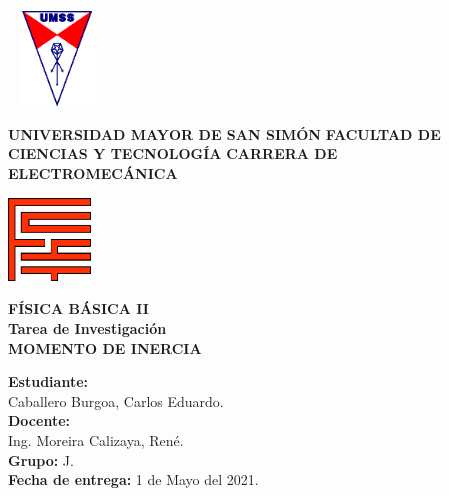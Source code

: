 \documentclass[letter,oneside,11pt]{article}
\begin{document}
\begin{titlepage}
    \begin{center}
        \begin{minipage}[]{.20\linewidth}
            \begin{flushleft}
                \includegraphics[width=2.6cm,height=2.6cm]{resources/umss.eps}
            \end{flushleft}
        \end{minipage}
        \begin{minipage}[]{.55\linewidth}
            \centering
            \large{\textbf{UNIVERSIDAD MAYOR DE SAN SIMÓN}} \newline
            \large{\textbf{FACULTAD DE CIENCIAS Y TECNOLOGÍA}} \newline
            \large{\textbf{CARRERA DE ELECTROMECÁNICA}} \newline
        \end{minipage}
        \begin{minipage}[]{.20\linewidth}
            \begin{flushright}
                \includegraphics[width=2.2cm,height=2.2cm]{resources/fcyt.eps}
            \end{flushright}
        \end{minipage}

        \vspace*{3.0cm}
        {\Large \textbf{FÍSICA BÁSICA II}}\\
        \vspace*{0.3cm}
        {\Large \textbf{Tarea de Investigación}}\\
        \vspace*{3.5cm}
        {\Large \textbf{MOMENTO DE INERCIA}}\\
    \end{center}

    \vspace*{6.5cm}
    \leftskip=7.95cm
    \noindent
    \textbf{Estudiante:}\\
    Caballero Burgoa, Carlos Eduardo.\\
    \newline
    \textbf{Docente:}\\
    Ing. Moreira Calizaya, René.\\
    \newline
    \textbf{Grupo:} J.\\
    \textbf{Fecha de entrega:} 1 de Mayo del 2021.\\
\end{titlepage}
\end{document}
